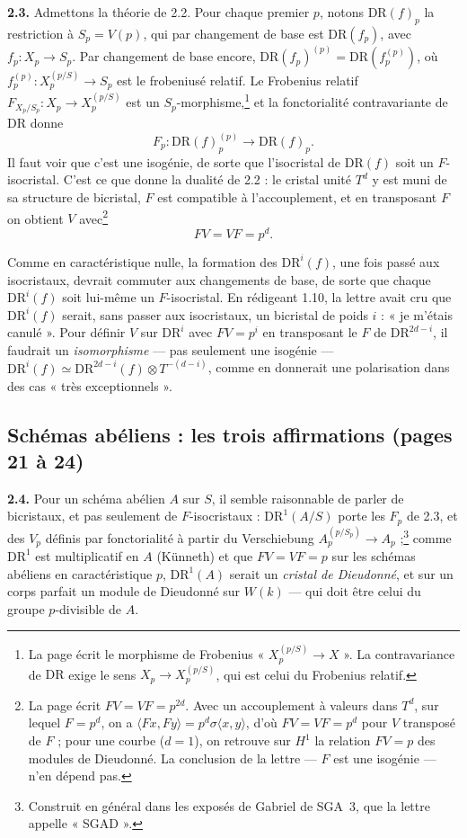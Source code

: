 \documentclass[11pt,a4paper]{article}
\begin{document}
\textbf{2.3.} Admettons la théorie de 2.2. Pour chaque premier $p$, notons
$\mathrm{DR}(f)_p$ la restriction à $S_p = V(p)$, qui par changement de base
est $\mathrm{DR}(f_p)$, avec $f_p : X_p \to S_p$. Par changement de base encore,
$\mathrm{DR}(f_p)^{(p)} = \mathrm{DR}(f_p^{(p)})$, où
$f_p^{(p)} : X_p^{(p/S)} \to S_p$ est le frobeniusé relatif. Le Frobenius
relatif $F_{X_p/S_p} : X_p \to X_p^{(p/S)}$ est un $S_p$-morphisme,\footnote{La
page écrit le morphisme de Frobenius « $X_p^{(p/S)} \to X$ ». La
contravariance de $\mathrm{DR}$ exige le sens $X_p \to X_p^{(p/S)}$, qui est
celui du Frobenius relatif.} et la fonctorialité contravariante de
$\mathrm{DR}$ donne
\[
  F_p : \mathrm{DR}(f)_p^{(p)} \longrightarrow \mathrm{DR}(f)_p .
\]
Il faut voir que c'est une isogénie, de sorte que
l'isocristal de $\mathrm{DR}(f)$ soit un $F$-isocristal. C'est ce que donne la
dualité de 2.2 : le cristal unité $T^d$ y est muni de sa structure de
bicristal, $F$ est compatible à l'accouplement, et en transposant $F$ on
obtient $V$ avec\footnote{La page écrit $FV = VF = p^{2d}$. Avec un accouplement à valeurs dans
$T^d$, sur lequel $F = p^d$, on a $\langle Fx, Fy\rangle = p^d \sigma\langle
x,y\rangle$, d'où $FV = VF = p^d$ pour $V$ transposé de $F$ ; pour une courbe
($d = 1$), on retrouve sur $H^1$ la relation $FV = p$ des modules de Dieudonné.
La conclusion de la lettre — $F$ est une isogénie — n'en dépend pas.}
\[
  FV = VF = p^d .
\]

Comme en caractéristique nulle, la formation des $\mathrm{DR}^i(f)$, une fois
passé aux isocristaux, devrait commuter aux changements de base, de sorte que
chaque $\mathrm{DR}^i(f)$ soit lui-même un $F$-isocristal. En rédigeant 1.10,
la lettre avait cru que $\mathrm{DR}^i(f)$ serait, sans passer aux isocristaux,
un bicristal de poids $i$ : « je m'étais canulé ». Pour définir $V$ sur
$\mathrm{DR}^i$ avec $FV = p^i$ en transposant le $F$ de $\mathrm{DR}^{2d-i}$,
il faudrait un \emph{isomorphisme} — pas seulement une isogénie —
$\mathrm{DR}^i(f) \simeq \mathrm{DR}^{2d-i}(f) \otimes T^{-(d-i)}$, comme en
donnerait une polarisation dans des cas « très exceptionnels ».

\subsection*{Schémas abéliens : les trois affirmations (pages 21 à 24)}

\textbf{2.4.} Pour un schéma abélien $A$ sur $S$, il semble raisonnable de
parler de bicristaux, et pas seulement de $F$-isocristaux : $\mathrm{DR}^1(A/S)$
porte les $F_p$ de 2.3, et des $V_p$ définis par fonctorialité à partir du
Verschiebung $A_p^{(p/S_p)} \to A_p$ ;\footnote{Construit en général dans les
exposés de Gabriel de SGA~3, que la lettre appelle « SGAD ».} comme
$\mathrm{DR}^1$ est multiplicatif en $A$ (Künneth) et que $FV = VF = p$ sur les
schémas abéliens en caractéristique $p$, $\mathrm{DR}^1(A)$ serait un
\emph{cristal de Dieudonné}, et sur un corps parfait un module de Dieudonné
sur $W(k)$ — qui doit être celui du groupe $p$-divisible de $A$.
\end{document}
